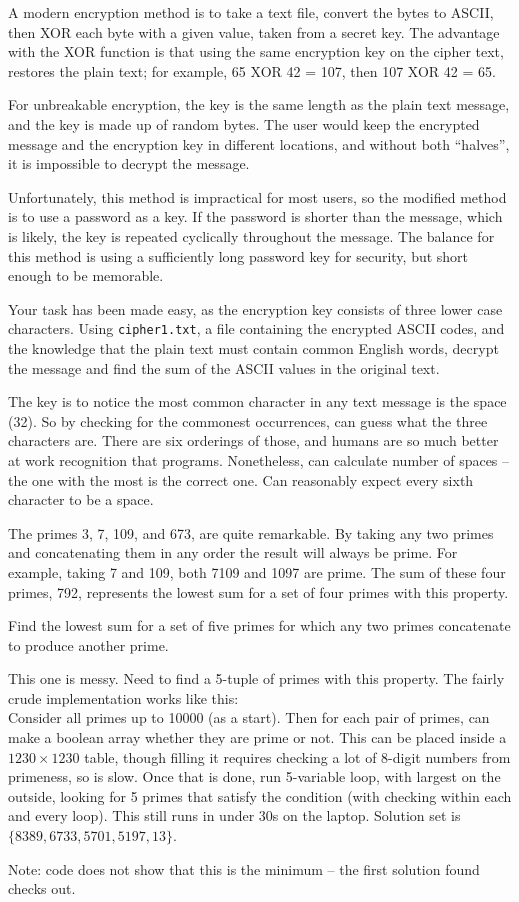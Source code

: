 A modern encryption method is to take a text file, convert the bytes to ASCII, then XOR each byte with a given value, taken from a secret key. The advantage with the XOR function is that using the same encryption key on the cipher text, restores the plain text; for example, 65 XOR 42 = 107, then 107 XOR 42 = 65.

For unbreakable encryption, the key is the same length as the plain text message, and the key is made up of random bytes. The user would keep the encrypted message and the encryption key in different locations, and without both ``halves'', it is impossible to decrypt the message.

Unfortunately, this method is impractical for most users, so the modified method is to use a password as a key. If the password is shorter than the message, which is likely, the key is repeated cyclically throughout the message. The balance for this method is using a sufficiently long password key for security, but short enough to be memorable.

Your task has been made easy, as the encryption key consists of three lower case characters. Using \verb"cipher1.txt", a file containing the encrypted ASCII codes, and the knowledge that the plain text must contain common English words, decrypt the message and find the sum of the ASCII values in the original text.

The key is to notice the most common character in any text message is the space (32).  So by checking for the commonest occurrences, can guess what the three characters are.  There are six orderings of those, and humans are so much better at work recognition that programs.  Nonetheless, can calculate number of spaces -- the one with the most is the correct one.  Can reasonably expect every sixth character to be a space.





The primes 3, 7, 109, and 673, are quite remarkable. By taking any two primes and concatenating them in any order the result will always be prime. For example, taking 7 and 109, both 7109 and 1097 are prime. The sum of these four primes, 792, represents the lowest sum for a set of four primes with this property.

Find the lowest sum for a set of five primes for which any two primes concatenate to produce another prime.

This one is messy.  Need to find a 5-tuple of primes with this property.  The fairly crude implementation works like this:\\
Consider all primes up to 10000 (as a start).  Then for each pair of primes, can make a boolean array whether they are prime or not.  This can be placed inside a $1230\times1230$ table, though filling it requires checking a lot of 8-digit numbers from primeness, so is slow.  Once that is done, run 5-variable loop, with largest on the outside, looking for 5 primes that satisfy the condition (with checking within each and every loop).  This still runs in under 30s on the laptop.  
Solution set is $\{8389, 6733, 5701, 5197, 13\}$.  

\footnotesize
Note: code does not show that this is the minimum -- the first solution found checks out.

\normalsize
{}


